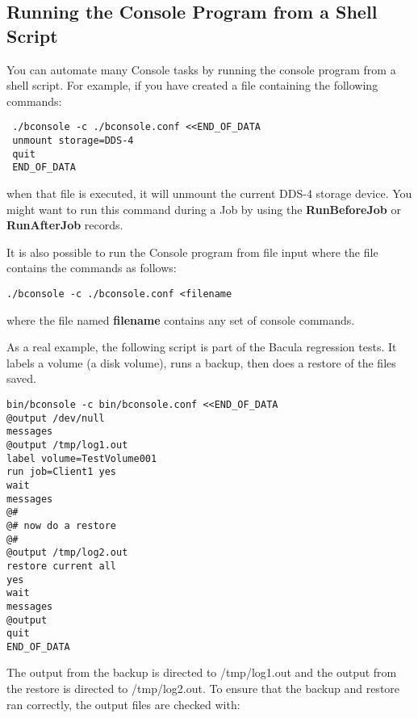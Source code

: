 \label{scripting}

\subsection*{Running the Console Program from a Shell Script}

You can automate many Console tasks by running the console program from a
shell script. For example, if you have created a file containing the following
commands: 

\footnotesize
\begin{verbatim}
 ./bconsole -c ./bconsole.conf <<END_OF_DATA
 unmount storage=DDS-4
 quit
 END_OF_DATA
\end{verbatim}
\normalsize

when that file is executed, it will unmount the current DDS-4 storage device.
You might want to run this command during a Job by using the {\bf
RunBeforeJob} or {\bf RunAfterJob} records. 

It is also possible to run the Console program from file input where the file
contains the commands as follows: 

\footnotesize
\begin{verbatim}
./bconsole -c ./bconsole.conf <filename
\end{verbatim}
\normalsize

where the file named {\bf filename} contains any set of console commands. 

As a real example, the following script is part of the Bacula regression
tests. It labels a volume (a disk volume), runs a backup, then does a restore
of the files saved. 

\footnotesize
\begin{verbatim}
bin/bconsole -c bin/bconsole.conf <<END_OF_DATA
@output /dev/null
messages
@output /tmp/log1.out
label volume=TestVolume001
run job=Client1 yes
wait
messages
@#
@# now do a restore
@#
@output /tmp/log2.out
restore current all
yes
wait
messages
@output
quit
END_OF_DATA
\end{verbatim}
\normalsize

The output from the backup is directed to /tmp/log1.out and the output from
the restore is directed to /tmp/log2.out. To ensure that the backup and
restore ran correctly, the output files are checked with: 


